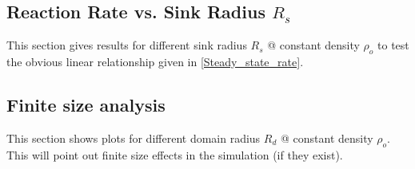 \subsection{Reaction Rate vs. Sink Radius $R_s$}
This section gives results for different sink radius $R_s$ @ constant density $\rho_o$ to test the obvious linear relationship given in \eqref{Steady_state_rate}.

\subsection{Finite size analysis}
This section shows plots for different domain radius $R_d$ @ constant density $\rho_o$.
This will point out finite size effects in the simulation (if they exist). 

